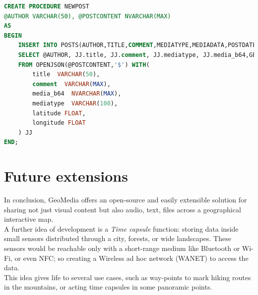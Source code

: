 \documentclass[conference]{IEEEtran}
\begin{document}
\begin{lstlisting}[language=SQL, caption=Stored Procedure of post creation]
CREATE PROCEDURE NEWPOST
@AUTHOR VARCHAR(50), @POSTCONTENT NVARCHAR(MAX)
AS
BEGIN
	INSERT INTO POSTS(AUTHOR,TITLE,COMMENT,MEDIATYPE,MEDIADATA,POSTDATETIME, LATITUDE, LONGITUDE)
	SELECT @AUTHOR, JJ.title, JJ.comment, JJ.mediatype, JJ.media_b64,GETDATE(), JJ.latitude ,JJ.longitude 
	FROM OPENJSON(@POSTCONTENT,'$') WITH(
		title  VARCHAR(50),
		comment  VARCHAR(MAX),
		media_b64  NVARCHAR(MAX),
		mediatype  VARCHAR(100),
		latitude FLOAT,
		longitude FLOAT
	) JJ
END;

\end{lstlisting}


\section{Future extensions}

In conclusion, GeoMedia offers an open-source and easily extensible solution for sharing not just visual content but also audio, text, files across a geographical interactive map.
\\
A further idea of development is a \textit{Time capsule} function: storing data inside small sensors distributed through a city, forests, or wide landscapes.
These sensors would be reachable only with a short-range medium like Bluetooth or Wi-Fi, or even NFC; so creating a Wireless ad hoc network (WANET) to access the data.
\\
This idea gives life to several use cases, such as way-points to mark hiking routes in the mountains, or acting time capsules in some panoramic points.
\end{document}

